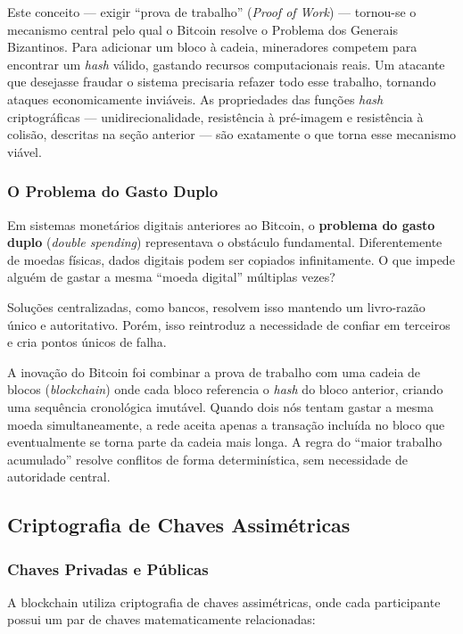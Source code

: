 Este conceito --- exigir ``prova de trabalho'' (\textit{Proof of Work}) --- tornou-se o mecanismo central pelo qual o Bitcoin resolve o Problema dos Generais Bizantinos. Para adicionar um bloco à cadeia, mineradores competem para encontrar um \textit{hash} válido, gastando recursos computacionais reais. Um atacante que desejasse fraudar o sistema precisaria refazer todo esse trabalho, tornando ataques economicamente inviáveis. As propriedades das funções \textit{hash} criptográficas --- unidirecionalidade, resistência à pré-imagem e resistência à colisão, descritas na seção anterior --- são exatamente o que torna esse mecanismo viável.

\subsubsection{O Problema do Gasto Duplo}

Em sistemas monetários digitais anteriores ao Bitcoin, o \textbf{problema do gasto duplo} (\textit{double spending}) representava o obstáculo fundamental. Diferentemente de moedas físicas, dados digitais podem ser copiados infinitamente. O que impede alguém de gastar a mesma ``moeda digital'' múltiplas vezes?

Soluções centralizadas, como bancos, resolvem isso mantendo um livro-razão único e autoritativo. Porém, isso reintroduz a necessidade de confiar em terceiros e cria pontos únicos de falha.

A inovação do Bitcoin foi combinar a prova de trabalho com uma cadeia de blocos (\textit{blockchain}) onde cada bloco referencia o \textit{hash} do bloco anterior, criando uma sequência cronológica imutável. Quando dois nós tentam gastar a mesma moeda simultaneamente, a rede aceita apenas a transação incluída no bloco que eventualmente se torna parte da cadeia mais longa. A regra do ``maior trabalho acumulado'' resolve conflitos de forma determinística, sem necessidade de autoridade central.

\subsection{Criptografia de Chaves Assimétricas}

\subsubsection{Chaves Privadas e Públicas}

A blockchain utiliza criptografia de chaves assimétricas, onde cada participante possui um par de chaves matematicamente relacionadas:


